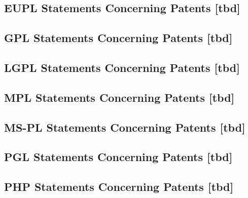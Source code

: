 \subsection{EUPL Statements Concerning Patents [tbd]}

\subsection{GPL Statements Concerning Patents [tbd]}

\subsection{LGPL Statements Concerning Patents [tbd]}
 
\subsection{MPL Statements Concerning Patents [tbd]}         

\subsection{MS-PL Statements Concerning Patents [tbd]}
  
\subsection{PGL Statements Concerning Patents [tbd]}

\subsection{PHP Statements Concerning Patents [tbd]}



% 
